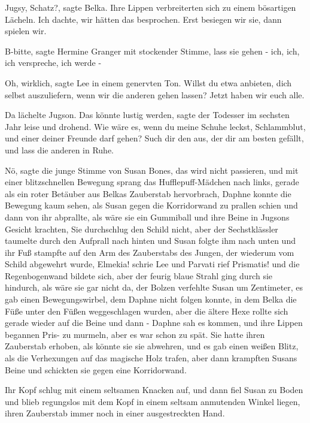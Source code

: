 \glqq Jugsy, Schatz?\grqq{}, sagte Belka. Ihre Lippen verbreiterten sich zu
einem bösartigen Lächeln. \glqq Ich dachte, wir hätten das besprochen. Erst
besiegen wir sie, dann spielen wir.\grqq{}

\glqq B-bitte\grqq{}, sagte Hermine Granger mit stockender Stimme, \glqq lass
sie gehen - ich, ich, ich verspreche, ich werde -\grqq{}

\glqq Oh, wirklich\grqq{}, sagte Lee in einem genervten Ton. \glqq Willst du
etwa anbieten, dich selbst auszuliefern, wenn wir die anderen gehen lassen?
Jetzt haben wir euch alle.\grqq{}

Da lächelte Jugson. \glqq Das könnte lustig werden\grqq{}, sagte der Todesser im
sechsten Jahr leise und drohend. \glqq Wie wäre es, wenn du meine Schuhe leckst,
Schlammblut, und einer deiner Freunde darf gehen? Such dir den aus, der dir am
besten gefällt, und lass die anderen in Ruhe.\grqq{}

\glqq Nö\grqq{}, sagte die junge Stimme von Susan Bones, \glqq das wird nicht
passieren\grqq{}, und mit einer blitzschnellen Bewegung sprang das
Hufflepuff-Mädchen nach links, gerade als ein roter Betäuber aus Belkas
Zauberstab hervorbrach, Daphne konnte die Bewegung kaum sehen, als Susan gegen
die Korridorwand zu prallen schien und dann von ihr abprallte, als wäre sie ein
Gummiball und ihre Beine in Jugsons Gesicht krachten, Sie durchschlug den Schild
nicht, aber der Sechstklässler taumelte durch den Aufprall nach hinten und Susan
folgte ihm nach unten und ihr Fuß stampfte auf den Arm des Zauberstabs des
Jungen, der wiederum vom Schild abgewehrt wurde, \glqq Elmekia! \glqq  schrie
Lee und Parvati rief \glqq Prismatis! \glqq  und die Regenbogenwand bildete
sich, aber der feurig blaue Strahl ging durch sie hindurch, als wäre sie gar
nicht da, der Bolzen verfehlte Susan um Zentimeter, es gab einen
Bewegungswirbel, dem Daphne nicht folgen konnte, in dem Belka die Füße unter den
Füßen weggeschlagen wurden, aber die ältere Hexe rollte sich gerade wieder auf
die Beine und dann - Daphne sah es kommen, und ihre Lippen begannen \glqq
Pris-\grqq{} zu murmeln, aber es war schon zu spät. Sie hatte ihren Zauberstab
erhoben, als könnte sie sie abwehren, und es gab einen weißen Blitz, als die
Verhexungen auf das magische Holz trafen, aber dann krampften Susans Beine und
schickten sie gegen eine Korridorwand.

Ihr Kopf schlug mit einem seltsamen Knacken auf, und dann fiel Susan zu Boden
und blieb regungslos mit dem Kopf in einem seltsam anmutenden Winkel liegen,
ihren Zauberstab immer noch in einer ausgestreckten Hand.


